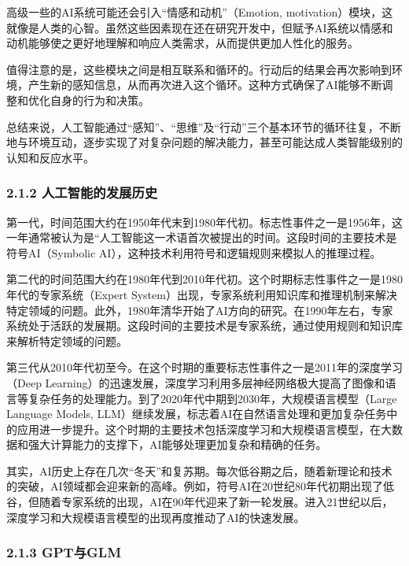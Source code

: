 高级一些的AI系统可能还会引入``情感和动机''（Emotion,
motivation）模块，这就像是人类的心智。虽然这些因素现在还在研究开发中，但赋予AI系统以情感和动机能够使之更好地理解和响应人类需求，从而提供更加人性化的服务。

值得注意的是，这些模块之间是相互联系和循环的。行动后的结果会再次影响到环境，产生新的感知信息，从而再次进入这个循环。这种方式确保了AI能够不断调整和优化自身的行为和决策。

总结来说，人工智能通过``感知''、``思维''及``行动''三个基本环节的循环往复，不断地与环境互动，逐步实现了对复杂问题的解决能力，甚至可能达成人类智能级别的认知和反应水平。

\subsubsection{\texorpdfstring{\textbf{2.1.2
人工智能的发展历史}}{2.1.2 人工智能的发展历史}}\label{212-ux4ebaux5de5ux667aux80fdux7684ux53d1ux5c55ux5386ux53f2}

第一代，时间范围大约在1950年代末到1980年代初。标志性事件之一是1956年，这一年通常被认为是``人工智能这一术语首次被提出的时间。这段时间的主要技术是符号AI（Symbolic
AI），这种技术利用符号和逻辑规则来模拟人的推理过程。

第二代的时间范围大约在1980年代到2010年代初。这个时期标志性事件之一是1980年代的专家系统（Expert
System）出现，专家系统利用知识库和推理机制来解决特定领域的问题。此外，1980年清华开始了AI方向的研究。在1990年左右，专家系统处于活跃的发展期。这段时间的主要技术是专家系统，通过使用规则和知识库来解析特定领域的问题。

第三代从2010年代初至今。在这个时期的重要标志性事件之一是2011年的深度学习（Deep
Learning）的迅速发展，深度学习利用多层神经网络极大提高了图像和语言等复杂任务的处理能力。到了2020年代中期到2030年，大规模语言模型（Large
Language Models,
LLM）继续发展，标志着AI在自然语言处理和更加复杂任务中的应用进一步提升。这个时期的主要技术包括深度学习和大规模语言模型，在大数据和强大计算能力的支撑下，AI能够处理更加复杂和精确的任务。

其实，AI历史上存在几次``冬天''和复苏期。每次低谷期之后，随着新理论和技术的突破，AI领域都会迎来新的高峰。例如，符号AI在20世纪80年代初期出现了低谷，但随着专家系统的出现，AI在90年代迎来了新一轮发展。进入21世纪以后，深度学习和大规模语言模型的出现再度推动了AI的快速发展。

\subsubsection{\texorpdfstring{\textbf{2.1.3
GPT与GLM}}{2.1.3 GPT与GLM}}\label{213-gptux4e0eglm}

